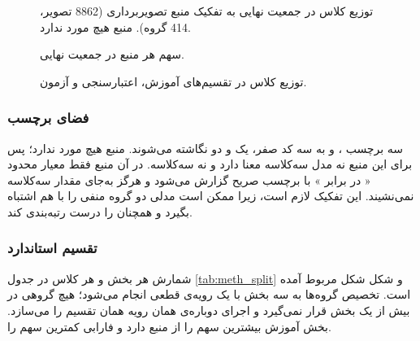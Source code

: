 \begin{figure}[htbp]
  \centering
  \caption{توزیع کلاس در جمعیت نهایی به تفکیک منبع تصویربرداری (8862 تصویر، 414 گروه). منبع  هیچ مورد  ندارد.}
  \label{fig:U1}
\end{figure}

\begin{figure}[htbp]
  \centering
  \caption{سهم هر منبع در جمعیت نهایی.}
  \label{fig:U2}
\end{figure}

\begin{figure}[htbp]
  \centering
  \caption{توزیع کلاس در تقسیم‌های آموزش، اعتبارسنجی و آزمون.}
  \label{fig:U3}
\end{figure}




\subsubsection{فضای برچسب}

سه برچسب ،  و  به سه کد صفر، یک و دو نگاشته می‌شوند. منبع  هیچ مورد  ندارد؛ پس برای این منبع نه مدل سه‌کلاسه معنا دارد و نه  سه‌کلاسه. در آن منبع فقط معیار محدود « در برابر » با برچسب صریح گزارش می‌شود و هرگز به‌جای مقدار سه‌کلاسه نمی‌نشیند. این تفکیک لازم است، زیرا ممکن است مدلی دو گروه منفی را با هم اشتباه بگیرد و همچنان  را درست رتبه‌بندی کند.

\subsubsection{تقسیم استاندارد}

شمارش هر بخش و هر کلاس در جدول \ref{tab:meth_split} و شکل شکل مربوط آمده است. تخصیص گروه‌ها به سه بخش با یک رویه‌ی قطعی انجام می‌شود؛ هیچ گروهی در بیش از یک بخش قرار نمی‌گیرد و اجرای دوباره‌ی همان رویه همان تقسیم را می‌سازد. بخش آموزش بیشترین سهم را از منبع  دارد و فارابی کمترین سهم را.

